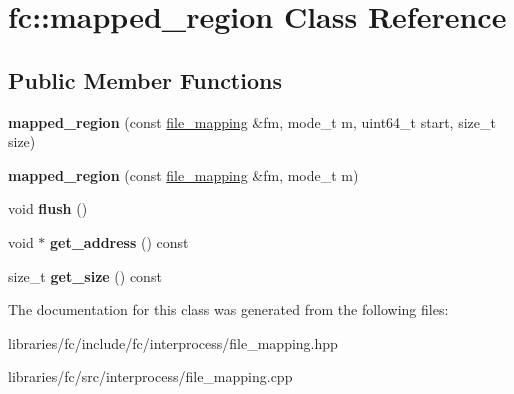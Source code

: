 \hypertarget{classfc_1_1mapped__region}{}\section{fc\+:\+:mapped\+\_\+region Class Reference}
\label{classfc_1_1mapped__region}
\subsection*{Public Member Functions}
\begin{DoxyCompactItemize}
\item 
\mbox{\label{classfc_1_1mapped__region_a8f87bf8cb960123feef9b013a623715a}} 
{\bfseries mapped\+\_\+region} (const \mbox{\hyperlink{classfc_1_1file__mapping}{file\+\_\+mapping}} \&fm, mode\+\_\+t m, uint64\+\_\+t start, size\+\_\+t size)
\item 
\mbox{\label{classfc_1_1mapped__region_ad43d7360fca04ea8b119fead81d3affc}} 
{\bfseries mapped\+\_\+region} (const \mbox{\hyperlink{classfc_1_1file__mapping}{file\+\_\+mapping}} \&fm, mode\+\_\+t m)
\item 
\mbox{\label{classfc_1_1mapped__region_a12ba94b8e57ff75abbf7cfd1ade01a84}} 
void {\bfseries flush} ()
\item 
\mbox{\label{classfc_1_1mapped__region_ae4c454063de929a27170d91e8c332ac6}} 
void $\ast$ {\bfseries get\+\_\+address} () const
\item 
\mbox{\label{classfc_1_1mapped__region_acecc565e9417b87b1ad8577b02b428cc}} 
size\+\_\+t {\bfseries get\+\_\+size} () const
\end{DoxyCompactItemize}


The documentation for this class was generated from the following files\+:\begin{DoxyCompactItemize}
\item 
libraries/fc/include/fc/interprocess/file\+\_\+mapping.\+hpp\item 
libraries/fc/src/interprocess/file\+\_\+mapping.\+cpp\end{DoxyCompactItemize}
